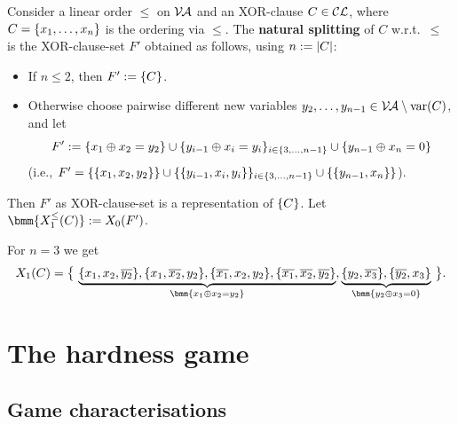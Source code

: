 \documentclass[12pt]{book}
\begin{document}
\begin{defi}\label{def:1softxor}
  \cite{h8} Consider a linear order $\le$ on $\mathcal{V\hspace{-0.1em}A}$ and an XOR-clause $C \in \mathcal{CL}$, where $C = \{ x_1,\dots,x_n \}$ is the ordering via $\le$. 
  The \textbf{natural splitting} of $C$ w.r.t.\ $\le$ is the XOR-clause-set $F'$ obtained as follows, using $n := \lvert C \rvert$:
  \begin{itemize}
  \item If $n \le 2$, then $F' := \{ C \}$.
  \item Otherwise choose pairwise different new variables $y_2, \dots, y_{n-1} \in \mathcal{V\hspace{-0.1em}A} \setminus \operatorname{var}(C)$, and let
    \begin{displaymath}
      F' := \{ x_1 \oplus x_2 = y_2 \} \cup \{ y_{i-1} \oplus x_i = y_i \}_{i \in \{ 3, \dots, n-1 \}} \cup \{ y_{n-1} \oplus x_n = 0 \}
    \end{displaymath}
    (i.e., $F' = \{ \{ x_1,x_2,y_2 \} \} \cup \{ \{ y_{i-1},x_i,y_{i} \} \}_{i \in \{ 3, \dots, n-1 \}} \cup \{ \{ y_{n-1},x_n \} \}$).
  \end{itemize}
  Then $F'$ as XOR-clause-set is a representation of $\{ C \}$. Let $\bmm{X_1^{\le}(C)} := X_0(F')$.
\end{defi}

\begin{examp}\label{exp:xortrans}
  \cite{h8} For $n = 3$ we get
  \begin{displaymath}
    X_1(C) = \setb{ \underbrace{\set{x_1,x_2,\ol{y_2}}, \set{x_1,\ol{x_2},y_2}, \set{\ol{x_1},x_2, y_2}, 
	\set{\ol{x_1},\ol{x_2},\ol{y_2}}}_{\bmm{x_1 \oplus x_2 = y_2}},\underbrace{\set{y_2,\ol{x_3}}, \set{\ol{y_2},x_3} }_{\bmm{y_2 \oplus x_3 = 0}} }.
  \end{displaymath}
\end{examp}

\chapter{The hardness game}
\label{cha:hdgame}

\section{Game characterisations}
\label{sec:game-charc}
\end{document}
